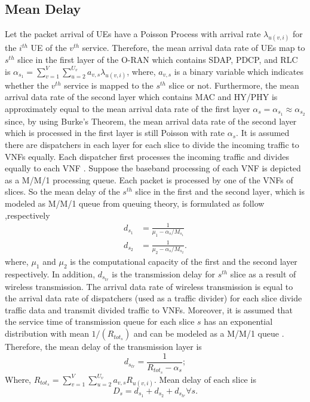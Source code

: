 \documentclass[conference]{IEEEtran}
\begin{document}
\subsection{Mean Delay}
Let the packet arrival of UEs have a Poisson Process with arrival rate $\lambda_{u(v,i)}$ for the $i^{th}$ UE of the $v^{th}$ service. 
Therefore, the mean arrival data rate of UEs map to $s^{th}$ slice in the first layer of the O-RAN which contains SDAP, PDCP, and RLC is 
$\alpha_{s_1} = \sum_{v=1}^{V}\sum_{u=2}^{U_v}a_{v,s}\lambda_{u(v,i)}$, where, $a_{v,s}$ is a binary variable which indicates whether the $v^{th}$ service is mapped to the $s^{th}$ slice or not. 
Furthermore, the mean arrival data rate of the second layer which contains MAC and HY/PHY is approximately equal to the mean arrival data rate of the first layer $\alpha_{s} =\alpha_{s_1} \approx \alpha_{s_2}$ since, by using Burke’s Theorem, the mean arrival data rate of the second layer which is processed in the first layer is still Poisson with rate $\alpha_{s}$. 
It is assumed there are dispatchers in each layer for each slice to divide the incoming traffic to VNFs equally. Each dispatcher first processes the incoming traffic and divides equally to each VNF  \cite{frdl,luong2018novel,luong2018novel1}.
Suppose the baseband processing of each VNF is depicted as a M/M/1 processing queue.
Each packet is processed by one of the VNFs of slices. So the mean delay of the $s^{th}$ slice in the first and the second layer, which is modeled as M/M/1 queue from queuing theory, is formulated as follow
,respectively
\begin{equation}
\begin{split}
d_{s_1} &= \frac{1}{\mu_1 - \alpha_{s}/{M_{s_1}}} \\
d_{s_2} &= \frac{1}{\mu_2 - \alpha_{s}/{M_{s_2}}}.
\end{split}
\end{equation}
where, $\mu_1$ and $\mu_2$ is the computational capacity of the first and the second layer respectively.
In addition, $d_{s_{tr}}$ is the transmission delay for $s^{th}$ slice as a result of wireless transmission. The arrival data rate of wireless transmission
 is equal to the arrival data rate of dispatchers (used as a traffic divider) for each slice divide traffic data and transmit divided traffic to VNFs.
Moreover, it is assumed that the service time of transmission queue for each slice $s$ has 
 an exponential distribution with mean $1/(R_{{tot}_s})$ and can be modeled as a M/M/1 queue \cite{frdl,luong2018novel,luong2018novel1}. Therefore, 
the mean delay of the transmission layer is 
\begin{equation}
d_{s_{tr}} = \frac{1}{R_{{tot}_s} - \alpha_{s}};
\end{equation}
Where, $R_{{tot}_s} =  \sum_{v=1}^{V}\sum_{u=2}^{U_v}a_{v,s}R_{u(v,i)}$.
Mean delay of each slice is
\begin{equation}
D_{s} = d_{s_1} + d_{s_2} + d_{s_{tr}} \forall s.
\end{equation} 
\end{document}
